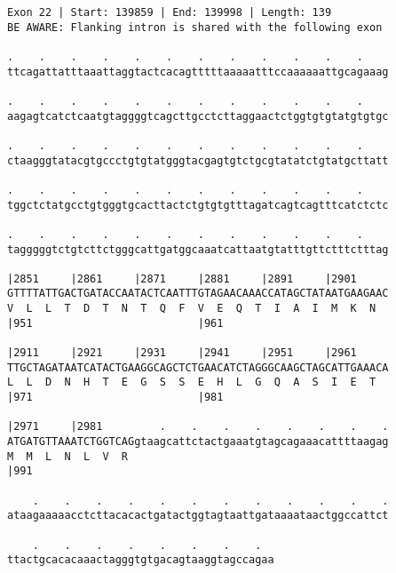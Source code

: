 \documentclass{article}
\begin{document}
\begin{Verbatim}[fontfamily=courier]
Exon 22 | Start: 139859 | End: 139998 | Length: 139
BE AWARE: Flanking intron is shared with the following exon

.    .    .    .    .    .    .    .    .    .    .    .    
ttcagattatttaaattaggtactcacagtttttaaaaatttccaaaaaattgcagaaag

.    .    .    .    .    .    .    .    .    .    .    .    
aagagtcatctcaatgtaggggtcagcttgcctcttaggaactctggtgtgtatgtgtgc

.    .    .    .    .    .    .    .    .    .    .    .    
ctaagggtatacgtgccctgtgtatgggtacgagtgtctgcgtatatctgtatgcttatt

.    .    .    .    .    .    .    .    .    .    .    .    
tggctctatgcctgtgggtgcacttactctgtgtgtttagatcagtcagtttcatctctc

.    .    .    .    .    .    .    .    .    .    .    .    
tagggggtctgtcttctgggcattgatggcaaatcattaatgtatttgttctttctttag

|2851     |2861     |2871     |2881     |2891     |2901     
GTTTTATTGACTGATACCAATACTCAATTTGTAGAACAAACCATAGCTATAATGAAGAAC
V  L  L  T  D  T  N  T  Q  F  V  E  Q  T  I  A  I  M  K  N  
|951                          |961                          

|2911     |2921     |2931     |2941     |2951     |2961     
TTGCTAGATAATCATACTGAAGGCAGCTCTGAACATCTAGGGCAAGCTAGCATTGAAACA
L  L  D  N  H  T  E  G  S  S  E  H  L  G  Q  A  S  I  E  T  
|971                          |981                          

|2971     |2981         .    .    .    .    .    .    .    .
ATGATGTTAAATCTGGTCAGgtaagcattctactgaaatgtagcagaaacattttaagag
M  M  L  N  L  V  R                                         
|991                                                        

    .    .    .    .    .    .    .    .    .    .    .    .
ataagaaaaacctcttacacactgatactggtagtaattgataaaataactggccattct

    .    .    .    .    .    .    .    .  
ttactgcacacaaactagggtgtgacagtaaggtagccagaa
\end{Verbatim}
\newpage
\end{document}

